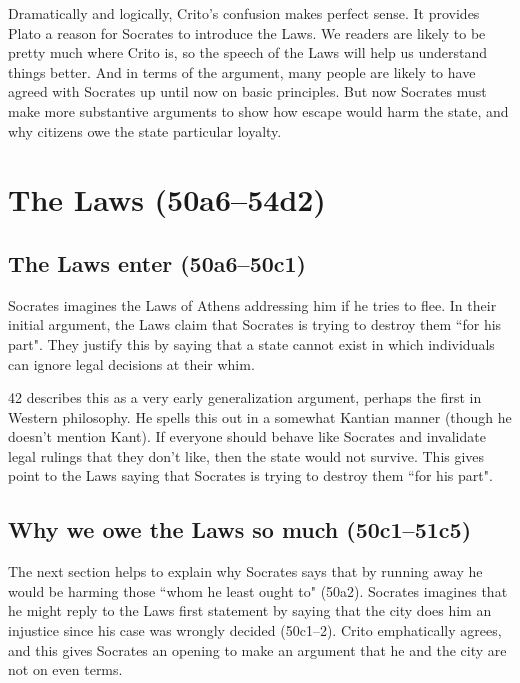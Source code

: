 \documentclass[12pt,letterpaper]{article}
\begin{document}
Dramatically and logically, Crito's confusion makes perfect sense. It
provides Plato a reason for Socrates to introduce the Laws. We readers are
likely to be pretty much where Crito is, so the speech of the Laws will
help us understand things better. And in terms of the argument, many
people are likely to have agreed with Socrates up until now on basic
principles. But now Socrates must make more substantive arguments to show
how escape would harm the state, and why citizens owe the state particular
loyalty.



\section*{The Laws (50a6--54d2)}

\subsection*{The Laws enter (50a6--50c1)}

Socrates imagines the Laws of Athens addressing him if he tries to flee. In their initial argument, the Laws claim that Socrates is trying to destroy them ``for his part". They justify this by saying that a state cannot exist in which individuals can ignore legal decisions at their whim.

\cite{kraut-socrates-state-1984} 42 describes this as a very early generalization argument, perhaps the first in Western philosophy. He spells this out in a somewhat Kantian manner (though he doesn't mention Kant). If everyone should behave like Socrates and invalidate legal rulings that they don't like, then the state would not survive. This gives point to the Laws saying that Socrates is trying to destroy them ``for his part".

\subsection*{Why we owe the Laws so much (50c1--51c5)}

The next section helps to explain why Socrates says that by running away he would be harming those ``whom he least ought to" (50a2). Socrates imagines that he might reply to the Laws first statement by saying that the city does him an injustice since his case was wrongly decided (50c1--2). Crito emphatically agrees, and this gives Socrates an opening to make an argument that he and the city are not on even terms.
\end{document}

